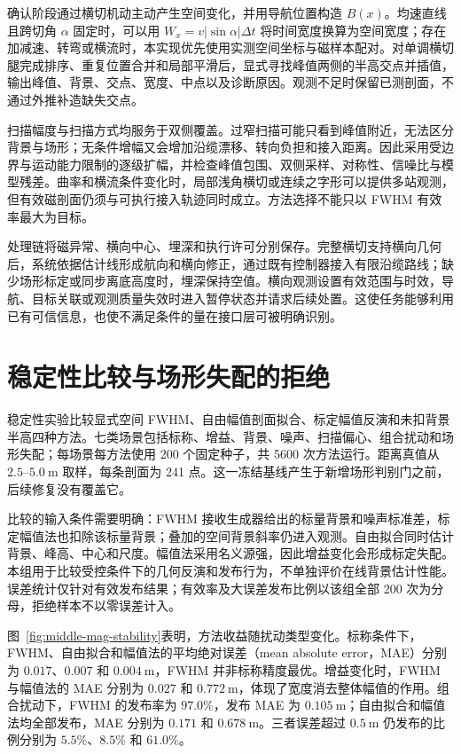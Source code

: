 确认阶段通过横切机动主动产生空间变化，并用导航位置构造 $B(x)$。均速直线且跨切角 $\alpha$ 固定时，可以用 $W_x=v|\sin\alpha|\Delta t$ 将时间宽度换算为空间宽度；存在加减速、转弯或横流时，本实现优先使用实测空间坐标与磁样本配对。对单调横切腿完成排序、重复位置合并和局部平滑后，显式寻找峰值两侧的半高交点并插值，输出峰值、背景、交点、宽度、中点以及诊断原因。观测不足时保留已测剖面，不通过外推补造缺失交点。

扫描幅度与扫描方式均服务于双侧覆盖。过窄扫描可能只看到峰值附近，无法区分背景与场形；无条件增幅又会增加沿缆漂移、转向负担和接入距离。因此采用受边界与运动能力限制的逐级扩幅，并检查峰值包围、双侧采样、对称性、信噪比与模型残差。曲率和横流条件变化时，局部浅角横切或连续之字形可以提供多站观测，但有效磁剖面仍须与可执行接入轨迹同时成立。方法选择不能只以 FWHM 有效率最大为目标。

处理链将磁异常、横向中心、埋深和执行许可分别保存。完整横切支持横向几何后，系统依据估计线形成航向和横向修正，通过既有控制器接入有限沿缆路线；缺少场形标定或同步离底高度时，埋深保持空值。横向观测设置有效范围与时效，导航、目标关联或观测质量失效时进入暂停状态并请求后续处置。这使任务能够利用已有可信信息，也使不满足条件的量在接口层可被明确识别。

\section{稳定性比较与场形失配的拒绝}
\label{sec:middle-mag-stability}

稳定性实验比较显式空间 FWHM、自由幅值剖面拟合、标定幅值反演和未扣背景半高四种方法。七类场景包括标称、增益、背景、噪声、扫描偏心、组合扰动和场形失配；每场景每方法使用 200 个固定种子，共 5600 次方法运行。距离真值从 $2.5$--$5.0~\mathrm{m}$ 取样，每条剖面为 241 点。这一冻结基线产生于新增场形判别门之前，后续修复没有覆盖它。

比较的输入条件需要明确：FWHM 接收生成器给出的标量背景和噪声标准差，标定幅值法也扣除该标量背景；叠加的空间背景斜率仍进入观测。自由拟合同时估计背景、峰高、中心和尺度。幅值法采用名义源强，因此增益变化会形成标定失配。本组用于比较受控条件下的几何反演和发布行为，不单独评价在线背景估计性能。误差统计仅针对有效发布结果；有效率及大误差发布比例以该组全部 200 次为分母，拒绝样本不以零误差计入。

图~\ref{fig:middle-mag-stability}表明，方法收益随扰动类型变化。标称条件下，FWHM、自由拟合和幅值法的平均绝对误差（mean absolute error，MAE）分别为 $0.017$、$0.007$ 和 $0.004~\mathrm{m}$，FWHM 并非标称精度最优。增益变化时，FWHM 与幅值法的 MAE 分别为 $0.027$ 和 $0.772~\mathrm{m}$，体现了宽度消去整体幅值的作用。组合扰动下，FWHM 的发布率为 $97.0\%$，发布 MAE 为 $0.105~\mathrm{m}$；自由拟合和幅值法均全部发布，MAE 分别为 $0.171$ 和 $0.678~\mathrm{m}$。三者误差超过 $0.5~\mathrm{m}$ 仍发布的比例分别为 $5.5\%$、$8.5\%$ 和 $61.0\%$。

